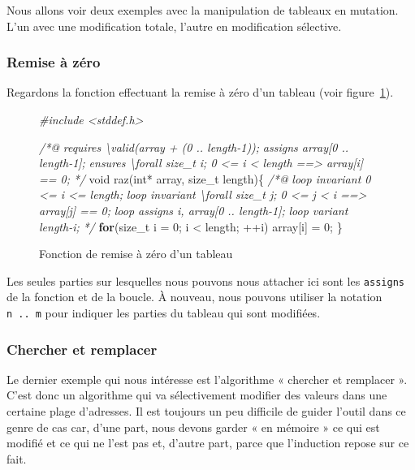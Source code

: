 \documentclass[12pt,francais,]{scrbook}
\newenvironment{Shaded}{}{}
\newcommand{\KeywordTok}[1]{\textcolor[rgb]{0.00,0.44,0.13}{\textbf{{#1}}}}
\newcommand{\DataTypeTok}[1]{\textcolor[rgb]{0.56,0.13,0.00}{{#1}}}
\newcommand{\DecValTok}[1]{\textcolor[rgb]{0.25,0.63,0.44}{{#1}}}
\newcommand{\CommentTok}[1]{\textcolor[rgb]{0.38,0.63,0.69}{\textit{{#1}}}}
\newcommand{\NormalTok}[1]{{#1}}
\begin{document}
Nous allons voir deux exemples avec la manipulation de tableaux en
mutation. L'un avec une modification totale, l'autre en modification
sélective.

\subsubsection{Remise à zéro}\label{remise-uxe0-zuxe9ro}

Regardons la fonction effectuant la remise à zéro d'un tableau (voir
figure~\ref{fig:4-4-2-1-raz}).

\begin{figure}[htbp]
  \centering
\begin{footnotesize}\begin{Shaded}
\begin{Highlighting}[]
\CommentTok{#include <stddef.h>}

\CommentTok{/*@}
\CommentTok{  requires \textbackslash{}valid(array + (0 .. length-1));}
\CommentTok{  assigns  array[0 .. length-1];}
\CommentTok{  ensures  \textbackslash{}forall size_t i; 0 <= i < length ==> array[i] == 0;}
\CommentTok{*/}
\DataTypeTok{void} \NormalTok{raz(}\DataTypeTok{int}\NormalTok{* array, size_t length)\{}
  \CommentTok{/*@}
\CommentTok{    loop invariant 0 <= i <= length;}
\CommentTok{    loop invariant \textbackslash{}forall size_t j; 0 <= j < i ==> array[j] == 0;}
\CommentTok{    loop assigns i, array[0 .. length-1];}
\CommentTok{    loop variant length-i;}
\CommentTok{  */}
  \KeywordTok{for}\NormalTok{(size_t i = }\DecValTok{0}\NormalTok{; i < length; ++i)}
    \NormalTok{array[i] = }\DecValTok{0}\NormalTok{;}
\NormalTok{\}}
\end{Highlighting}
\end{Shaded}\end{footnotesize}
\caption{Fonction de remise à zéro d'un tableau}
\label{fig:4-4-2-1-raz}
\end{figure}

Les seules parties sur lesquelles nous pouvons nous attacher ici sont
les \texttt{assigns} de la fonction et de la boucle. À nouveau, nous
pouvons utiliser la notation \texttt{n\ ..\ m} pour indiquer les parties
du tableau qui sont modifiées.

\subsubsection{Chercher et remplacer}\label{chercher-et-remplacer}

Le dernier exemple qui nous intéresse est l'algorithme « chercher et
remplacer ». C'est donc un algorithme qui va sélectivement modifier des
valeurs dans une certaine plage d'adresses. Il est toujours un peu
difficile de guider l'outil dans ce genre de cas car, d'une part, nous
devons garder « en mémoire » ce qui est modifié et ce qui ne l'est pas
et, d'autre part, parce que l'induction repose sur ce fait.
\end{document}
